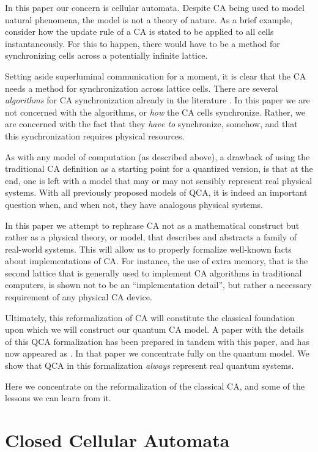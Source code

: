 \documentclass{jca}
\begin{document}
In this paper our concern is cellular automata. 
Despite CA being used to model natural phenomena, the model is not a theory of nature. 
As a brief example, consider how the update rule of a CA is stated to be applied to all cells instantaneously.
For this to happen, there would have to be a method for synchronizing cells across a potentially infinite lattice. 

Setting aside superluminal communication for a moment, it is clear that the CA needs a method for synchronization across lattice cells.
There are several \emph{algorithms} for CA synchronization already in the literature \cite{async}.
In this paper we are not concerned with the algorithms, or \emph{how} the CA cells synchronize.
Rather, we are concerned with the fact that they \emph{have to} synchronize, somehow, and that this synchronization requires physical resources.

As with any model of computation (as described above), a drawback of using the traditional CA definition as a starting point for a quantized version, is that at the end, one is left with a model that may or may not sensibly represent real physical systems. 
With all previously proposed models of QCA, it is indeed an important question when, and when not, they have analogous physical systems.


In this paper we  attempt to rephrase CA not as a mathematical construct but rather as a physical theory, or model, that describes and abstracts a family of real-world systems.
This will allow us to properly formalize well-known facts about implementations of CA.
For instance, the use of extra memory, that is the second lattice that is generally used to implement CA algorithms in traditional computers, is shown not to be an ``implementation detail'', but rather a necessary requirement of any physical CA device.


Ultimately, this reformalization of CA will constitute the classical foundation upon which we will construct our quantum CA model.
A paper with the details of this QCA formalization has been prepared in tandem with this paper, and has now appeared as \cite{cp07}.
In that paper we concentrate fully on the quantum model. We show that QCA in this formalization \emph{always} represent real quantum systems.

Here we concentrate on the reformalization of the classical CA, and some of the lessons we can learn from it.


\section{Closed Cellular Automata}\label{sec:CCA}
\end{document}
